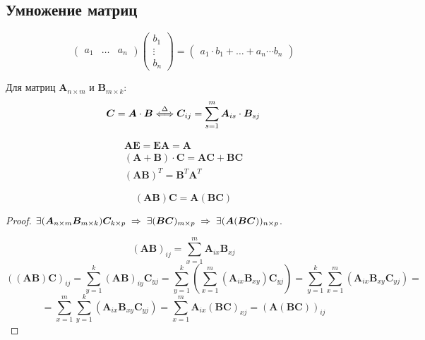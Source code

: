 \subsection{Умножение матриц}
\begin{equation}
    \begin{pmatrix} a_1 & \ldots & a_n \end{pmatrix}
    \begin{pmatrix} b_1 \\ \vdots \\ b_n \end{pmatrix} =
    \begin{pmatrix} a_1 \cdot b_1 + \ldots + a_n \cdots b_n \end{pmatrix}
\end{equation}

Для матриц $\bm{A}_{n \times m}$ и $\bm{B}_{m \times k}$:
\begin{equation}
    \bm{C} = \bm{A} \cdot \bm{B} \stackrel{\Delta}{\Longleftrightarrow} \bm{C}_{ij} = \sum_{s=1}^{m} \bm{A}_{is} \cdot \bm{B}_{sj}
\end{equation}


\begin{gather}
    \bm{AE} = \bm{EA} = \bm{A} \\
    (\bm{A} + \bm{B}) \cdot \bm{C} = \bm{AC} + \bm{BC} \\
    (\bm{AB})^T = \bm{B}^T \bm{A}^T
\end{gather}

\begin{theorem}
    \[ (\bm{A} \bm{B}) \bm{C} = \bm{A} (\bm{B} \bm{C}) \]
\end{theorem}

\begin{proof}
    $\exists (\bm{A}_{n \times m} \bm{B}_{m \times k}) \bm{C}_{k \times p} \;\Rightarrow\; \exists (\bm{B} \bm{C})_{m \times p} \;\Rightarrow\; \exists (\bm{A} (\bm{B} \bm{C}))_{n \times p}$.

    \[ (\bm{AB})_{ij} = \sum_{x=1}^{m} \bm{A}_{ix} \bm{B}_{xj} \]
    \[
        ((\bm{AB})\bm{C})_{ij} =
        \sum_{y=1}^{k} (\bm{AB})_{iy} \bm{C}_{yj} =
        \sum_{y = 1}^k (\sum_{x=1}^m (\bm{A}_{ix} \bm{B}_{xy}) \bm{C}_{yj}) =
        \sum_{y = 1}^k \sum_{x=1}^m (\bm{A}_{ix} \bm{B}_{xy} \bm{C}_{yj}) =
    \]
    \[ 
        = \sum_{x = 1}^m \sum_{y=1}^k (\bm{A}_{ix} \bm{B}_{xy} \bm{C}_{yj}) =
        \sum_{x = 1}^m \bm{A}_{ix} (\bm{BC})_{xj} =
        (\bm{A}(\bm{BC}))_{ij}
    \]
\end{proof}
